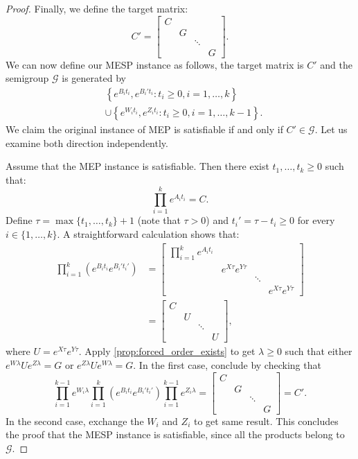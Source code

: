 \begin{proof}
Finally, we define the target matrix:
\[C'=\begin{bmatrix}C&&&\\&G&&\\&&\ddots&\\&&&G\end{bmatrix}.\]
We can now define our MESP instance as follows, the target matrix is $C'$ and the semigroup $\mathcal{G}$
is generated by
\begin{align*}
&\left\lbrace e^{B_{i}t_{i}},e^{B_{i}'t_{i}}:t_{i}\geqslant0,i=1,\ldots,k\right\rbrace \\
&\cup\left\lbrace e^{W_{i}t_{i}},e^{Z_{i}t_{i}}:t_{i}\geqslant0,i=1,\ldots,k-1\right\rbrace.
\end{align*}
We claim the original instance of MEP is satisfiable if and only if $C'\in\mathcal{G}$.
Let us examine both direction independently.

Assume that the MEP instance is satisfiable. Then there exist $t_1,\ldots,t_k\geqslant0$ such that:
\[\prod_{i=1}^{k}e^{A_{i}t_{i}}=C.\]
Define $\tau=\max\lbrace t_1,\ldots,t_k\rbrace+1$ (note that $\tau>0$) and $t_{i}'=\tau-t_{i}\geqslant0$ for every $i\in\lbrace 1,\ldots,k\rbrace$.
A straightforward calculation shows that:
\begin{align*}
\prod_{i=1}^{k}\left(e^{B_{i}t_{i}}e^{B_{i}'t_{i}'}\right)
    &=\begin{bmatrix}\prod_{i=1}^{k}e^{A_{i}t_{i}}&&&\\&e^{X\tau}e^{Y\tau}&&\\&&\ddots&\\&&&e^{X\tau}e^{Y\tau}\end{bmatrix}\\
    &=\begin{bmatrix}C&&&\\&U&&\\&&\ddots&\\&&&U\end{bmatrix},
\end{align*}
where $U=e^{X\tau}e^{Y\tau}$. Apply \cref{prop:forced_order_exists} to get $\lambda\geqslant0$
such that either $e^{W\lambda}Ue^{Z\lambda}=G$ or $e^{Z\lambda}Ue^{W\lambda}=G$. In the first case, conclude by
checking that
\[
\prod_{i=1}^{k-1}e^{W_{i}\lambda}\prod_{i=1}^{k}\left(e^{B_{i}t_{i}}e^{B_{i}'t_{i}'}\right)\prod_{i=1}^{k-1}e^{Z_{i}\lambda}
    =\begin{bmatrix}C&&&\\&G&&\\&&\ddots&\\&&&G\end{bmatrix}=C'.
\]
In the second case, exchange the $W_{i}$ and $Z_{i}$ to get same result. This concludes the proof that
the MESP instance is satisfiable, since all the products belong to $\mathcal{G}$.


\end{proof}
